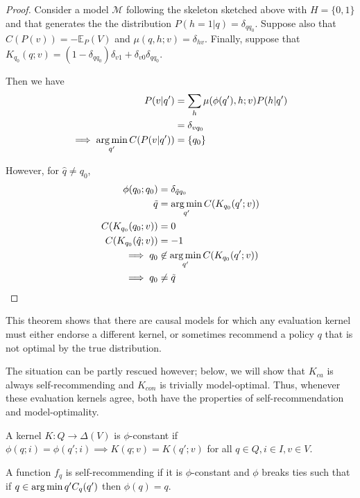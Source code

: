\begin{proof}
Consider a model $\mathscr{M}$ following the skeleton sketched above with $H=\{0,1\}$ and that generates the the distribution $P(h=1|q) = \delta_{q q_0}$. Suppose also that $C(P(v)) = -\mathbb{E}_P (V)$ and $\mu(q,h;v) = \delta_{hv}$. Finally, suppose that $K_{q_0}(q;v) = (1-\delta_{q q_0})\delta_{v1} + \delta_{v0} \delta_{q q_0}$. 

Then we have
\begin{align}
    P(v|q') &= \sum_h \mu (\phi(q'),h;v) P(h|q')\\
            &= \delta_{v q_0}\\
    \implies \operatorname*{arg\,min}_{q'} C(P(v|q')) &= \{q_0\}
\end{align}

However, for $\hat{q}\neq q_0$,
\begin{align}
    \phi(q_0;q_0) &= \delta_{\tilde{q}q_0}\\
        \tilde{q} &= \operatorname*{arg\,min}_{q'} C(K_{q_0}(q';v)) \\
    C(K_{q_0}(q_0;v)) &= 0\\
    C(K_{q_0}(\hat{q};v)) &= -1\\
    \implies q_0 &\not\in \operatorname*{arg\,min}_{q'} C(K_{q_0}(q';v))\\
    \implies q_0 &\neq \tilde{q}
\end{align}
\end{proof}

This theorem shows that there are causal models for which any evaluation kernel must either endorse a different kernel, or sometimes recommend a policy $q$ that is not optimal by the true distribution.

The situation can be partly rescued however; below, we will show that $K_{ca}$ is always self-recommending and $K_{con}$ is trivially model-optimal. Thus, whenever these evaluation kernels agree, both have the properties of self-recommendation and model-optimality.

\begin{definition}
    A kernel $K:Q\to \Delta(V)$ is $\phi$-constant if $\phi(q;i)=\phi(q';i)\implies K(q;v) = K(q';v)$ for all $q\in Q, i\in I, v\in V$.
\end{definition}

\begin{lemma}
A function $f_q$ is self-recommending if it is $\phi$-constant and $\phi$ breaks ties such that if $q\in \operatorname*{arg\,min}{q'} C_q(q')$ then $\phi(q)=q$.
\end{lemma}

